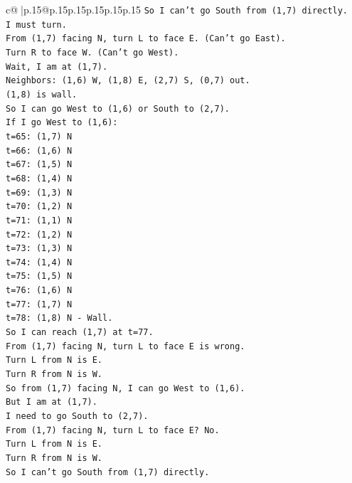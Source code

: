 \documentclass{article}
\begin{document}
{\begin{supertabular}{c@{$\;$}|p{.15\linewidth}@{}p{.15\linewidth}p{.15\linewidth}p{.15\linewidth}p{.15\linewidth}p{.15\linewidth}}
{{{\texttt{So I can't go South from (1,7) directly.} \\
\texttt{I must turn.} \\
\texttt{From (1,7) facing N, turn L to face E. (Can't go East).} \\
\texttt{Turn R to face W. (Can't go West).} \\
\texttt{Wait, I am at (1,7).} \\
\texttt{Neighbors: (1,6) W, (1,8) E, (2,7) S, (0,7) out.} \\
\texttt{(1,8) is wall.} \\
\texttt{So I can go West to (1,6) or South to (2,7).} \\
\texttt{If I go West to (1,6):} \\
\texttt{t=65: (1,7) N} \\
\texttt{t=66: (1,6) N} \\
\texttt{t=67: (1,5) N} \\
\texttt{t=68: (1,4) N} \\
\texttt{t=69: (1,3) N} \\
\texttt{t=70: (1,2) N} \\
\texttt{t=71: (1,1) N} \\
\texttt{t=72: (1,2) N} \\
\texttt{t=73: (1,3) N} \\
\texttt{t=74: (1,4) N} \\
\texttt{t=75: (1,5) N} \\
\texttt{t=76: (1,6) N} \\
\texttt{t=77: (1,7) N} \\
\texttt{t=78: (1,8) N {-} Wall.} \\
\texttt{So I can reach (1,7) at t=77.} \\
\texttt{From (1,7) facing N, turn L to face E is wrong.} \\
\texttt{Turn L from N is E.} \\
\texttt{Turn R from N is W.} \\
\texttt{So from (1,7) facing N, I can go West to (1,6).} \\
\texttt{But I am at (1,7).} \\
\texttt{I need to go South to (2,7).} \\
\texttt{From (1,7) facing N, turn L to face E? No.} \\
\texttt{Turn L from N is E.} \\
\texttt{Turn R from N is W.} \\
\texttt{So I can't go South from (1,7) directly.} \\
}}}
\end{supertabular}}
\end{document}
